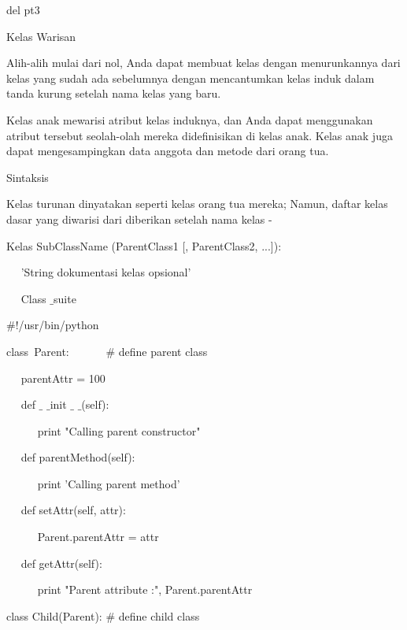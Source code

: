del pt3 \par
\vspace{12pt}
\vspace{12pt}
Kelas Warisan \par
\vspace{12pt}
Alih-alih mulai dari nol, Anda dapat membuat kelas dengan menurunkannya dari kelas yang sudah ada sebelumnya dengan mencantumkan kelas induk dalam tanda kurung setelah nama kelas yang baru. \par
\vspace{12pt}
Kelas anak mewarisi atribut kelas induknya, dan Anda dapat menggunakan atribut tersebut seolah-olah mereka didefinisikan di kelas anak. Kelas anak juga dapat mengesampingkan data anggota dan metode dari orang tua. \par
Sintaksis \par
\vspace{12pt}
Kelas turunan dinyatakan seperti kelas orang tua mereka; Namun, daftar kelas dasar yang diwarisi dari diberikan setelah nama kelas - \par
\vspace{12pt}
Kelas SubClassName (ParentClass1 [, ParentClass2, ...]): \par
~~ 'String dokumentasi kelas opsional' \par
~~ Class $  \_  $suite \par
 $  \#  $!/usr/bin/python \par
\vspace{12pt}
class~Parent:~~~~~~   $  \#  $ define parent class \par
~~ parentAttr = 100 \par
~~ def  $  \_  $ $  \_  $init $  \_  $ $  \_  $(self): \par
~~~~~ print "Calling parent constructor" \par
\vspace{12pt}
~~ def parentMethod(self): \par
~~~~~ print 'Calling parent method' \par
\vspace{12pt}
~~ def setAttr(self, attr): \par
~~~~~ Parent.parentAttr = attr \par
\vspace{12pt}
~~ def getAttr(self): \par
~~~~~ print "Parent attribute :", Parent.parentAttr \par
\vspace{12pt}
class Child(Parent):  $  \#  $ define child class \par
